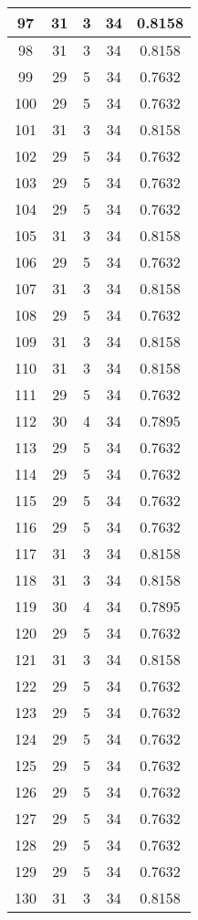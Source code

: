 \documentclass[letterpaper, 12pt]{article}
\begin{document}
\begin{longtable}{|c|c|c|c|c|}
\hline
97 & 31 & 3 & 34 & 0.8158 \\
\hline
98 & 31 & 3 & 34 & 0.8158 \\
\hline
99 & 29 & 5 & 34 & 0.7632 \\
\hline
100 & 29 & 5 & 34 & 0.7632 \\
\hline
101 & 31 & 3 & 34 & 0.8158 \\
\hline
102 & 29 & 5 & 34 & 0.7632 \\
\hline
103 & 29 & 5 & 34 & 0.7632 \\
\hline
104 & 29 & 5 & 34 & 0.7632 \\
\hline
105 & 31 & 3 & 34 & 0.8158 \\
\hline
106 & 29 & 5 & 34 & 0.7632 \\
\hline
107 & 31 & 3 & 34 & 0.8158 \\
\hline
108 & 29 & 5 & 34 & 0.7632 \\
\hline
109 & 31 & 3 & 34 & 0.8158 \\
\hline
110 & 31 & 3 & 34 & 0.8158 \\
\hline
111 & 29 & 5 & 34 & 0.7632 \\
\hline
112 & 30 & 4 & 34 & 0.7895 \\
\hline
113 & 29 & 5 & 34 & 0.7632 \\
\hline
114 & 29 & 5 & 34 & 0.7632 \\
\hline
115 & 29 & 5 & 34 & 0.7632 \\
\hline
116 & 29 & 5 & 34 & 0.7632 \\
\hline
117 & 31 & 3 & 34 & 0.8158 \\
\hline
118 & 31 & 3 & 34 & 0.8158 \\
\hline
119 & 30 & 4 & 34 & 0.7895 \\
\hline
120 & 29 & 5 & 34 & 0.7632 \\
\hline
121 & 31 & 3 & 34 & 0.8158 \\
\hline
122 & 29 & 5 & 34 & 0.7632 \\
\hline
123 & 29 & 5 & 34 & 0.7632 \\
\hline
124 & 29 & 5 & 34 & 0.7632 \\
\hline
125 & 29 & 5 & 34 & 0.7632 \\
\hline
126 & 29 & 5 & 34 & 0.7632 \\
\hline
127 & 29 & 5 & 34 & 0.7632 \\
\hline
128 & 29 & 5 & 34 & 0.7632 \\
\hline
129 & 29 & 5 & 34 & 0.7632 \\
\hline
130 & 31 & 3 & 34 & 0.8158 \\

\end{longtable}
\end{document}
